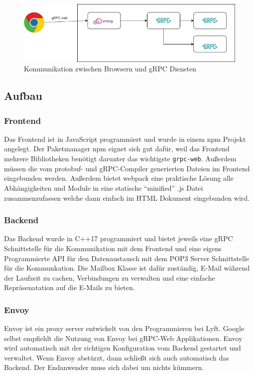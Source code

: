 \documentclass[12pt]{article}
\def\code#1{\texttt{#1}}
\begin{document}
\begin{figure}[htbp]
    \centering
    \includegraphics[scale=0.55]{grpc-web_communicaton}
    \caption{Kommunikation zwischen Browsern und gRPC Diensten \cite{abb1}}
    \label{fig:situation1}
\end{figure}
\FloatBarrier

\subsection{Aufbau}
\subsubsection{Frontend}
Das Frontend ist in JavaScript programmiert und wurde in einem npm Projekt
angelegt. Der Paketmanager npm eignet sich gut dafür, weil das Frontend mehrere
Bibliotheken benötigt darunter das wichtigste \code{grpc-web}. Außerdem müssen
die vom protobuf- und gRPC-Compiler generierten Dateien im Frontend eingebunden
werden. Außerdem bietet webpack \cite{webpack} eine praktische Lösung alle 
Abhängigkeiten und Module in eine statische "`minified"' .js Datei 
zusammenzufassen welche dann einfach im HTML Dokument eingebunden wird.

\subsubsection{Backend}
Das Backend wurde in C++17 programmiert und bietet jeweils eine gRPC 
Schnittstelle für die Kommunikation mit dem Frontend und eine eigens
Programmierte API für den Datenaustausch mit dem POP3 Server Schnittstelle für 
die Kommunkation. Die Mailbox Klasse ist dafür zuständig, E-Mail während der
Laufzeit zu cachen, Verbindungen zu verwalten und eine einfache Repräsenatation
auf die E-Mails zu bieten.

\subsubsection{Envoy}
Envoy ist ein proxy server entwickelt von den Programmieren bei Lyft. Google 
selbst empfiehlt die Nutzung von Envoy bei gRPC-Web Applikationen. Envoy wird 
automatisch mit der richtigen Konfiguration vom Backend gestartet und 
verwaltet. Wenn Envoy abstürzt, dann schließt sich auch automatisch das 
Backend. Der Endanwender muss sich dabei um nichts kümmern.
\end{document}

